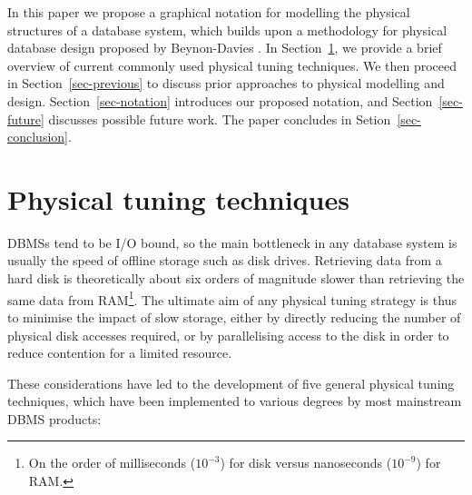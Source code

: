 \documentclass{llncs}
\begin{document}
In this paper we propose a graphical notation for modelling the physical
structures of a database system, which builds upon a methodology for
physical database design proposed by Beynon-Davies
\cite{BeDa-P-1992-PDD}. In Section~\ref{sec-techniques}, we provide a
brief overview of current commonly used physical tuning techniques. We
then proceed in Section~\ref{sec-previous} to discuss prior approaches
to physical modelling and design. Section~\ref{sec-notation} introduces
our proposed notation, and Section~\ref{sec-future} discusses possible
future work. The paper concludes in Setion~\ref{sec-conclusion}.


\section{Physical tuning techniques}
\label{sec-techniques}

DBMSs tend to be I/O bound, so the main bottleneck in any database
system is usually the speed of offline storage such as disk drives.
Retrieving data from a hard disk is theoretically about six orders of
magnitude slower than retrieving the same data from RAM\footnote{On the
order of milliseconds (\(10^{-3}\)) for disk versus nanoseconds
(\(10^{-9}\)) for RAM.}. The ultimate aim of any physical tuning
strategy is thus to minimise the impact of slow storage, either by
directly reducing the number of physical disk accesses required, or by
parallelising access to the disk in order to reduce contention for a
limited resource.

These considerations have led to the development of five general
physical tuning techniques, which have been implemented to various
degrees by most mainstream DBMS products:

\end{document}

